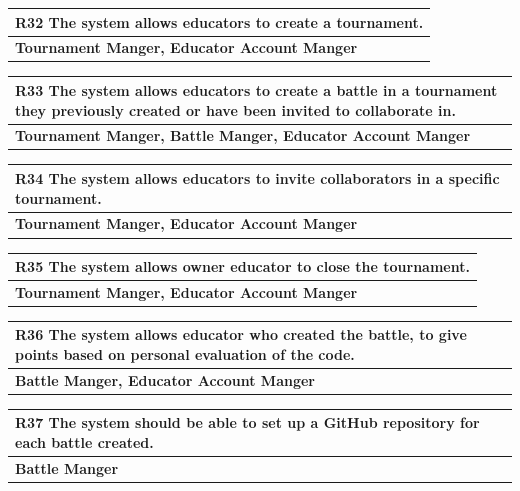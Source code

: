 \documentclass[12pt, a4paper]{report}
\begin{document}
\begin{table}[H]
    \begin{tabularx}{\textwidth}{X}
    \textbf{R32} The system allows educators to create a tournament. \\
    \hline 
    \textbf{Tournament Manger, Educator Account Manger}
    \end{tabularx}
\end{table}

\begin{table}[H]
    \begin{tabularx}{\textwidth}{X}
    \textbf{R33} The system allows educators to create a battle in a tournament they
    previously created or have been invited to collaborate in.\\
    \hline 
    \textbf{Tournament Manger, Battle Manger, Educator Account Manger} 
    \end{tabularx}
\end{table}

\begin{table}[H]
    \begin{tabularx}{\textwidth}{X}
    \textbf{R34} The system allows educators to invite collaborators in a specific tournament.\\
    \hline 
    \textbf{Tournament Manger, Educator Account Manger}
    \end{tabularx}
\end{table}

\begin{table}[H]
    \begin{tabularx}{\textwidth}{X}
    \textbf{R35} The system allows owner educator to close the tournament.\\
    \hline 
    \textbf{Tournament Manger, Educator Account Manger}
    \end{tabularx}
\end{table}

\begin{table}[H]
    \begin{tabularx}{\textwidth}{X}
    \textbf{R36} The system allows educator who created the battle, to give points based
    on personal evaluation of the code.\\
    \hline 
    \textbf{Battle Manger, Educator Account Manger}
    \end{tabularx}
\end{table}

\begin{table}[H]
    \begin{tabularx}{\textwidth}{X}
    \textbf{R37} The system should be able to set up a GitHub repository for each battle
    created.\\
    \hline 
    \textbf{Battle Manger}
\end{tabularx}
\end{table}
\end{document}
